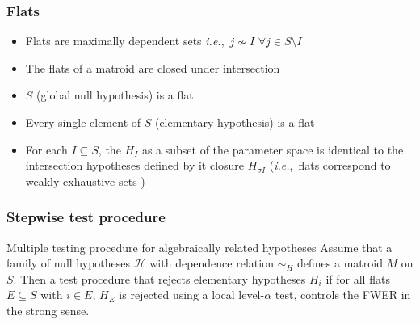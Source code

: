 \documentclass[bigger]{beamer}
\newcommand{\ie}{{\sl i.e.},~}
\begin{document}








\begin{frame}
\frametitle{Flats}
\begin{itemize}

\item Flats are maximally dependent sets \ie $j \nsim I$ $\forall j \in
  S\setminus I$
\item The flats of a matroid are closed under intersection
\item $S$ (global null hypothesis) is a flat
\item Every single element of $S$ (elementary hypothesis) is a flat
\item For each $I \subseteq S$, the $H_I$ as a subset of the parameter
  space is identical to the intersection hypotheses defined by it
  closure $H_{\sigma I}$ (\ie flats correspond to weakly exhaustive
  sets \cite{bergmann1988improvements})
\end{itemize} %
\end{frame}

\begin{frame}
 \frametitle{Stepwise test procedure}
 \begin{block}{Multiple testing procedure for algebraically related hypotheses}
   Assume that a family of null hypotheses $\mathscr{H}$ with
   dependence relation $\sim_H$ defines a matroid $M$ on $S$. Then a
   test procedure that rejects elementary hypotheses $H_i$ if for all
   flats $E \subseteq S$ with $i \in E$, $H_E$ is rejected using a
   local level-$\alpha$ test, controls the FWER in the strong sense.
 \end{block}

\end{frame}
\end{document}
